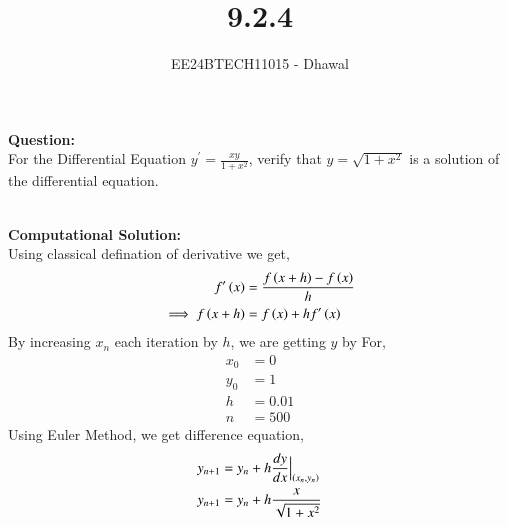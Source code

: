 \documentclass[journal]{IEEEtran}
\begin{document}

\vspace{3cm}

\title{9.2.4}
\author{EE24BTECH11015 - Dhawal}

{\let\newpage\relax\maketitle}

\renewcommand{\thefigure}{\theenumi}
\renewcommand{\thetable}{\theenumi}
\setlength{\intextsep}{10pt} %

\textbf{Question:}\\
For the Differential Equation $y^{\prime}=\frac{xy}{1+x^2}$, verify that $y=\sqrt{1+x^2}$ is a solution of the differential equation.

\\
\textbf{Computational Solution:}\\
Using classical defination of derivative we get,\\
\begin{align}
    f^{\prime}\left(x\right) &= \frac{f\left(x+h\right)-f\left(x\right)}{h}\\
    \implies f\left(x+h\right) &= f\left(x\right) + h f^{\prime}\left(x\right)
\end{align}
By increasing $x_n$ each iteration by $h$, we are getting $y$ by 
For,
\begin{align}
x_0 &= 0\\
y_0 &= 1\\
h &= 0.01\\
n &= 500
\end{align}
Using Euler Method, we get difference equation,
\begin{align}
y_{n+1} &= y_n + h\frac{dy}{dx}\Big|_{\left(x_n,y_n\right)}\\
y_{n+1} &= y_n + h \frac{x}{\sqrt{1+x^2}}
\end{align}
\end{document}
